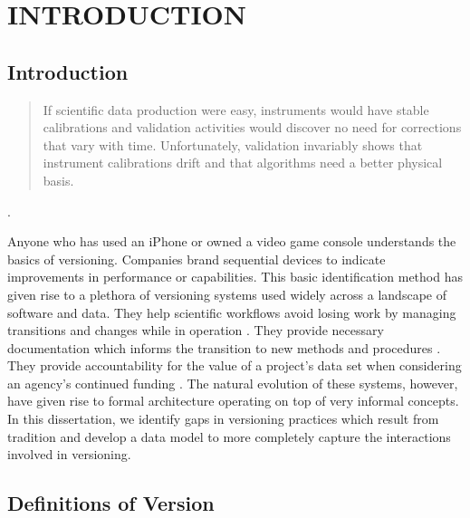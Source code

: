 
\chapter{INTRODUCTION}

\section{Introduction}

\begin{quotation}
	If scientific data production were easy, instruments would
	have stable calibrations and validation activities would discover no need for
	corrections that vary with time. Unfortunately, validation invariably shows that
	instrument calibrations drift and that algorithms need a better physical basis.
\end{quotation} \cite{Barkstrom2003}.

Anyone who has used an iPhone or owned a video game console understands the basics of versioning.
Companies brand sequential devices to indicate improvements in performance or capabilities.
This basic identification method has given rise to a plethora of versioning systems used widely across a landscape of software and data.
They help scientific workflows avoid losing work by managing transitions and changes while in operation \cite{Casati1996}.
They provide necessary documentation which informs the transition to new methods and procedures \cite{Wiil:2000:RDH:338407.338517}.
They provide accountability for the value of a project's data set when considering an agency's continued funding \cite{Cavanaugh2002}.
The natural evolution of these systems, however, have given rise to formal architecture operating on top of very informal concepts.
In this dissertation, we identify gaps in versioning practices which result from tradition and develop a data model to more completely capture the interactions involved in versioning.

\section{Definitions of Version}

